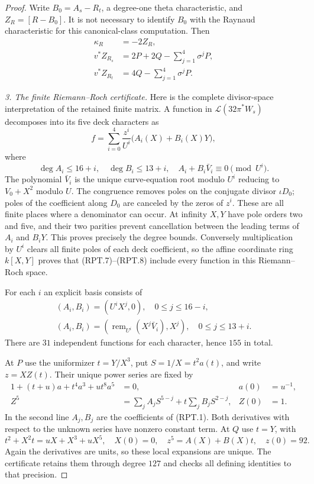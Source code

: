 \begin{proof}
Write $B_0=A_s-R_t$, a degree-one theta characteristic, and
$Z_R=[R-B_0]$. It is not necessary to identify $B_0$ with the
Raynaud characteristic for this canonical-class computation.
Then
\[
 \begin{aligned}
 \kappa_R&=-2Z_R,\\
 v^*Z_{R_s}&=2P+2Q-\sum_{j=1}^4\sigma^jP,\\
 v^*Z_{R_t}&=4Q-\sum_{j=1}^4\sigma^jP.
 \end{aligned}
 \tag{RPT.6}
\]

\emph{3. The finite Riemann--Roch certificate.}
Here is the complete divisor-space interpretation of the
retained finite matrix. A function in
$\mathcal L(32\pi^*W_s)$ decomposes into its five deck
characters as
\[
           f=\sum_{i=0}^4\frac{z^i}{U^i}
                              \bigl(A_i(X)+B_i(X)Y\bigr),
 \tag{RPT.7}
\]
where
\[
 \deg A_i\le16+i,\quad \deg B_i\le13+i,\quad
 A_i+B_i\bar V_i\equiv0\pmod{U^i}.
 \tag{RPT.8}
\]
The polynomial $\bar V_i$ is the unique curve-equation root
modulo $U^i$ reducing to $V_0+X^2$ modulo $U$.
The congruence removes poles on the conjugate divisor
$\iota D_0$; poles of the coefficient along $D_0$ are canceled
by the zeros of $z^i$. These are all finite places where a
denominator can occur. At infinity $X,Y$ have pole orders two
and five, and their two parities prevent cancellation between
the leading terms of $A_i$ and $B_iY$. This proves precisely
the degree bounds. Conversely multiplication by $U^i$ clears
all finite poles of each deck coefficient, so the affine
coordinate ring $k[X,Y]$ proves that (RPT.7)--(RPT.8) include
every function in this Riemann--Roch space.

For each $i$ an explicit basis consists of
\[
 \begin{gathered}
 (A_i,B_i)=(U^iX^j,0),\quad 0\le j\le16-i,\\
 (A_i,B_i)=
   (\operatorname{rem}_{U^i}(X^j\bar V_i),X^j),
                         \quad0\le j\le13+i.
 \end{gathered}
 \tag{RPT.9}
\]
There are $31$ independent functions for each character,
hence $155$ in total.

At $P$ use the uniformizer $t=Y/X^3$, put $S=1/X=t^2a(t)$,
and write $z=XZ(t)$. Their unique power series are fixed by
\[
 \begin{aligned}
 1+(t+u)a+t^4a^3+ut^8a^5&=0, & a(0)&=u^{-1},\\
 Z^5&=\sum_j A_jS^{5-j}
                   +t\sum_j B_jS^{2-j}, & Z(0)&=1.
 \end{aligned}
 \tag{RPT.10}
\]
In the second line $A_j,B_j$ are the coefficients of (RPT.1).
Both derivatives with respect to the unknown series have
nonzero constant term. At $Q$ use $t=Y$, with
\[
 t^2+X^2t=uX+X^3+uX^5,\quad X(0)=0,\quad
 z^5=A(X)+B(X)t,\quad z(0)=92.
 \tag{RPT.11}
\]
Again the derivatives are units, so these local expansions
are unique. The certificate retains them through degree
$127$ and checks all defining identities to that precision.


\end{proof}
